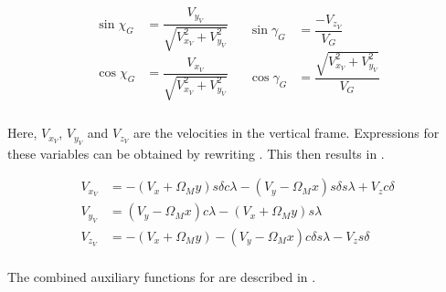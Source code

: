 \begin{align} \label{eq:velAngl}
\begin{split}
\sin \chi_{G} &= \dfrac{V_{y_{V}}}{\sqrt{V_{x_{V}}^{2}+V_{y_{V}}^{2}}} \\
\cos \chi_{G} &= \dfrac{V_{x_{V}}}{\sqrt{V_{x_{V}}^{2}+V_{y_{V}}^{2}}} \\
\end{split}
&
\begin{split}
\sin \gamma_{G} &= \dfrac{-V_{z_{V}}}{V_{G}}\\
\cos \gamma_{G} &= \dfrac{\sqrt{V_{x_{V}}^{2}+V_{y_{V}}^{2}}}{V_{G}}\\
\end{split} 
\end{align} 


Here, $V_{x_{V}}$, $V_{y_{V}}$ and $V_{z_{V}}$ are the velocities in the vertical frame. Expressions for these variables can be obtained by rewriting . This then results in .


\begin{equation} \label{eq:VV}
\begin{split}
V_{x_{V}} & = -\left(V_{x}+\Omega_{M}y\right) s \delta c\lambda - \left(V_{y}-\Omega_{M}x\right) s\delta s\lambda+V_{z}c\delta \\
V_{y_{V}} & = \left(V_{y}-\Omega_{M}x\right) c\lambda - \left(V_{x}+\Omega_{M} y \right) s\lambda \\
V_{z_{V}} & = -\left(V_{x}+\Omega_{M}y\right)-\left(V_{y}-\Omega_{M}x\right) c\delta s\lambda - V_{z} s\delta \\
\end{split}
\end{equation}

The combined auxiliary functions for  are described in .

